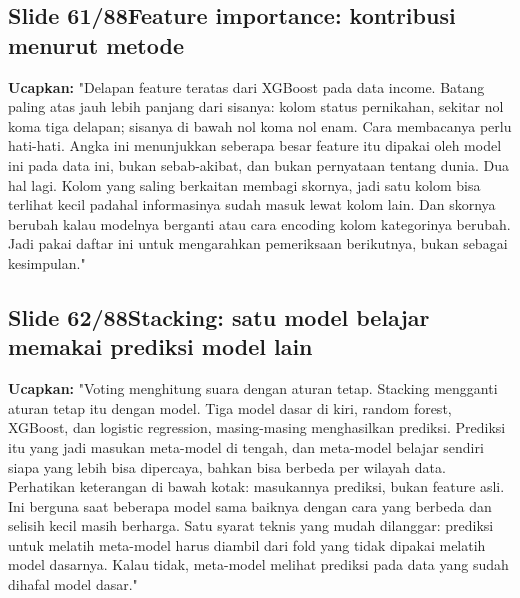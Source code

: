 \documentclass[11pt]{article}
\renewcommand{\framebox}[1]{\colorbox{acc!15}{\textcolor{acc}{\textbf{#1}}}}
\begin{document}
\subsection*{\framebox{Slide 61/88}\quad Feature importance: kontribusi menurut metode}
\textbf{Ucapkan:} "Delapan feature teratas dari XGBoost pada data income. Batang paling atas jauh lebih panjang dari sisanya: kolom status pernikahan, sekitar nol koma tiga delapan; sisanya di bawah nol koma nol enam. Cara membacanya perlu hati-hati. Angka ini menunjukkan seberapa besar feature itu dipakai oleh model ini pada data ini, bukan sebab-akibat, dan bukan pernyataan tentang dunia. Dua hal lagi. Kolom yang saling berkaitan membagi skornya, jadi satu kolom bisa terlihat kecil padahal informasinya sudah masuk lewat kolom lain. Dan skornya berubah kalau modelnya berganti atau cara encoding kolom kategorinya berubah. Jadi pakai daftar ini untuk mengarahkan pemeriksaan berikutnya, bukan sebagai kesimpulan."\\[2pt]

\subsection*{\framebox{Slide 62/88}\quad Stacking: satu model belajar memakai prediksi model lain}
\textbf{Ucapkan:} "Voting menghitung suara dengan aturan tetap. Stacking mengganti aturan tetap itu dengan model. Tiga model dasar di kiri, random forest, XGBoost, dan logistic regression, masing-masing menghasilkan prediksi. Prediksi itu yang jadi masukan meta-model di tengah, dan meta-model belajar sendiri siapa yang lebih bisa dipercaya, bahkan bisa berbeda per wilayah data. Perhatikan keterangan di bawah kotak: masukannya prediksi, bukan feature asli. Ini berguna saat beberapa model sama baiknya dengan cara yang berbeda dan selisih kecil masih berharga. Satu syarat teknis yang mudah dilanggar: prediksi untuk melatih meta-model harus diambil dari fold yang tidak dipakai melatih model dasarnya. Kalau tidak, meta-model melihat prediksi pada data yang sudah dihafal model dasar."\\[2pt]
\end{document}
